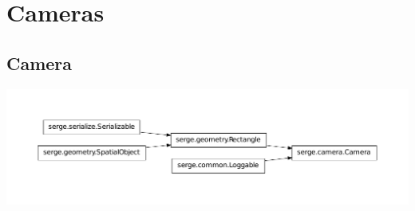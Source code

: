 \documentclass[letterpaper,10pt,english]{sphinxmanual}
\begin{document}
\section{Cameras}
\label{renderering:cameras}

\subsection{Camera}
\label{renderering:camera}
\includegraphics{inheritance-fa5fd197704648001c4011cb69768db04fd90252.pdf}
\end{document}
